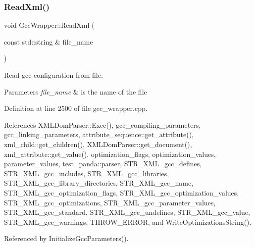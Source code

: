 \subsubsection{\texorpdfstring{Read\+Xml()}{ReadXml()}}
{\footnotesize\ttfamily void Gcc\+Wrapper\+::\+Read\+Xml (\begin{DoxyParamCaption}\item[{const std\+::string \&}]{file\+\_\+name }\end{DoxyParamCaption})}



Read gcc configuration from file. 


\begin{DoxyParams}{Parameters}
{\em file\+\_\+name} & is the name of the file \\
\hline
\end{DoxyParams}


Definition at line 2500 of file gcc\+\_\+wrapper.\+cpp.



References X\+M\+L\+Dom\+Parser\+::\+Exec(), gcc\+\_\+compiling\+\_\+parameters, gcc\+\_\+linking\+\_\+parameters, attribute\+\_\+sequence\+::get\+\_\+attribute(), xml\+\_\+child\+::get\+\_\+children(), X\+M\+L\+Dom\+Parser\+::get\+\_\+document(), xml\+\_\+attribute\+::get\+\_\+value(), optimization\+\_\+flags, optimization\+\_\+values, parameter\+\_\+values, test\+\_\+panda\+::parser, S\+T\+R\+\_\+\+X\+M\+L\+\_\+gcc\+\_\+defines, S\+T\+R\+\_\+\+X\+M\+L\+\_\+gcc\+\_\+includes, S\+T\+R\+\_\+\+X\+M\+L\+\_\+gcc\+\_\+libraries, S\+T\+R\+\_\+\+X\+M\+L\+\_\+gcc\+\_\+library\+\_\+directories, S\+T\+R\+\_\+\+X\+M\+L\+\_\+gcc\+\_\+name, S\+T\+R\+\_\+\+X\+M\+L\+\_\+gcc\+\_\+optimization\+\_\+flags, S\+T\+R\+\_\+\+X\+M\+L\+\_\+gcc\+\_\+optimization\+\_\+values, S\+T\+R\+\_\+\+X\+M\+L\+\_\+gcc\+\_\+optimizations, S\+T\+R\+\_\+\+X\+M\+L\+\_\+gcc\+\_\+parameter\+\_\+values, S\+T\+R\+\_\+\+X\+M\+L\+\_\+gcc\+\_\+standard, S\+T\+R\+\_\+\+X\+M\+L\+\_\+gcc\+\_\+undefines, S\+T\+R\+\_\+\+X\+M\+L\+\_\+gcc\+\_\+value, S\+T\+R\+\_\+\+X\+M\+L\+\_\+gcc\+\_\+warnings, T\+H\+R\+O\+W\+\_\+\+E\+R\+R\+OR, and Write\+Optimizations\+String().



Referenced by Initialize\+Gcc\+Parameters().

